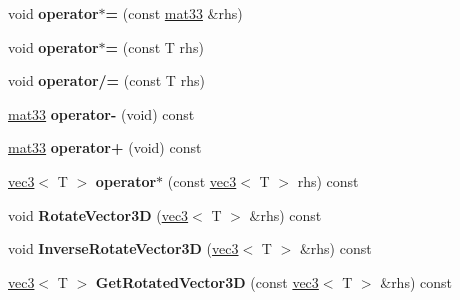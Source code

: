 \begin{DoxyCompactItemize}
\item 
\hypertarget{classmath_1_1mat33_a6aaf6d6a1e6123be504805110a46f2ac}{
void {\bfseries operator$\ast$=} (const \hyperlink{classmath_1_1mat33}{mat33} \&rhs)}
\label{classmath_1_1mat33_a6aaf6d6a1e6123be504805110a46f2ac}

\item 
\hypertarget{classmath_1_1mat33_a16d436cab3d8f47d53eb193294167545}{
void {\bfseries operator$\ast$=} (const T rhs)}
\label{classmath_1_1mat33_a16d436cab3d8f47d53eb193294167545}

\item 
\hypertarget{classmath_1_1mat33_aaf60baf7884b4c0f2c4f18ea71365a17}{
void {\bfseries operator/=} (const T rhs)}
\label{classmath_1_1mat33_aaf60baf7884b4c0f2c4f18ea71365a17}

\item 
\hypertarget{classmath_1_1mat33_a203a9ff845754e1683e5bbc7b3f728e0}{
\hyperlink{classmath_1_1mat33}{mat33} {\bfseries operator-\/} (void) const }
\label{classmath_1_1mat33_a203a9ff845754e1683e5bbc7b3f728e0}

\item 
\hypertarget{classmath_1_1mat33_abd6801139091e9cbe8142c30c5bb5199}{
\hyperlink{classmath_1_1mat33}{mat33} {\bfseries operator+} (void) const }
\label{classmath_1_1mat33_abd6801139091e9cbe8142c30c5bb5199}

\item 
\hypertarget{classmath_1_1mat33_a2371f91ef75ac80067bda4606c134e86}{
\hyperlink{classmath_1_1vec3}{vec3}$<$ T $>$ {\bfseries operator$\ast$} (const \hyperlink{classmath_1_1vec3}{vec3}$<$ T $>$ rhs) const }
\label{classmath_1_1mat33_a2371f91ef75ac80067bda4606c134e86}

\item 
\hypertarget{classmath_1_1mat33_a953a5828e33dd6832d781c5714377734}{
void {\bfseries RotateVector3D} (\hyperlink{classmath_1_1vec3}{vec3}$<$ T $>$ \&rhs) const }
\label{classmath_1_1mat33_a953a5828e33dd6832d781c5714377734}

\item 
\hypertarget{classmath_1_1mat33_aee13690c5e370dc2cf8fb2562d9b5724}{
void {\bfseries InverseRotateVector3D} (\hyperlink{classmath_1_1vec3}{vec3}$<$ T $>$ \&rhs) const }
\label{classmath_1_1mat33_aee13690c5e370dc2cf8fb2562d9b5724}

\item 
\hypertarget{classmath_1_1mat33_a55a87fdcb6c3b13f3dda1e44f2631bcc}{
\hyperlink{classmath_1_1vec3}{vec3}$<$ T $>$ {\bfseries GetRotatedVector3D} (const \hyperlink{classmath_1_1vec3}{vec3}$<$ T $>$ \&rhs) const }
\label{classmath_1_1mat33_a55a87fdcb6c3b13f3dda1e44f2631bcc}


\end{DoxyCompactItemize}
